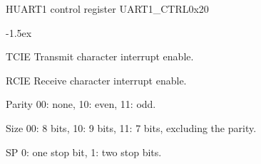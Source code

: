 \documentclass[12pt]{article}
\begin{document}
\begin{register}{H}{UART1 control register UART1\_CTRL}{0x20}
\label{uart1ctrl}
%
%
%
%
%
%
\regnewline%
\end{register}
\begin{regdesc}[0.7\textwidth]\begin{reglist}[00000]
\itemsep-1.5ex
\item[TCIE] Transmit character interrupt enable.
\item[RCIE] Receive character interrupt enable.
\item[Parity] 00: none, 10: even, 11: odd.
\item[Size] 00: 8 bits, 10: 9 bits, 11: 7 bits, excluding the parity.
\item[SP] 0: one stop bit, 1: two stop bits.
\end{reglist}\end{regdesc}
\end{document}
